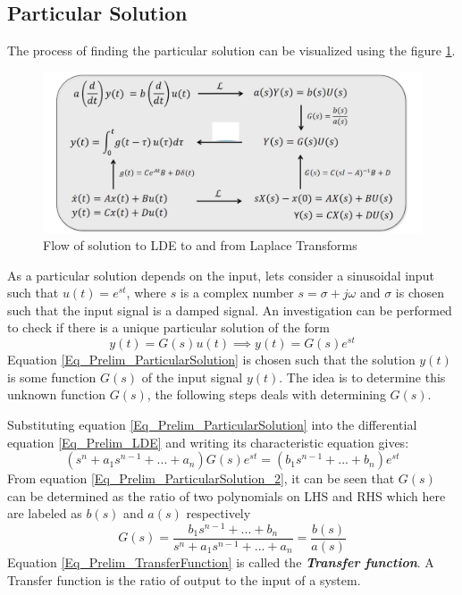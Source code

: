 \subsection{Particular Solution}
\newpage
The process of finding the particular solution can be visualized using the figure \ref{Fig_Pre_Flow_LDE_Sol_using_LT}.
\begin{figure}[h!]
	\centering
	\includegraphics[width=\linewidth]{Bilder/Solutiion_of_LDE_4m_LT}
	\caption{Flow of solution to LDE to and from Laplace Transforms}
	\label{Fig_Pre_Flow_LDE_Sol_using_LT}
\end{figure}

As a particular solution depends on the input, lets consider a sinusoidal input such that $ u(t) = e^{st}$, where $s$ is a complex number $s = \sigma + j \omega$ and $\sigma$ is chosen such that the input signal is a damped signal. An investigation can be performed to check if there is a unique particular solution of the form
\begin{equation} \label{Eq_Prelim_ParticularSolution}
	y(t) = G(s)u(t) \implies y(t) = G(s)e^{st}
\end{equation}
Equation \eqref{Eq_Prelim_ParticularSolution} is chosen such that the solution $y(t)$ is some function $G(s)$ of the input signal $y(t)$. The idea is to determine this unknown function $G(s)$, the following steps deals with determining $G(s)$. 

Substituting equation \eqref{Eq_Prelim_ParticularSolution} into the differential equation \eqref{Eq_Prelim_LDE} and writing its characteristic equation gives:
\begin{equation}\label{Eq_Prelim_ParticularSolution_2}
	(s^{n} + a_1 s^{n-1} + ... + a_n)G(s)e^{st} = (b_{1}s^{n-1} + ... + b_n)e^{st}
\end{equation}
From equation \eqref{Eq_Prelim_ParticularSolution_2}, it can be seen that $G(s)$ can be determined as the ratio of two polynomials on LHS and RHS which here are labeled as $b(s)$ and $a(s)$ respectively
\begin{equation}\label{Eq_Prelim_TransferFunction}
	G(s) = \frac{b_{1}s^{n-1} + ... + b_n}{s^{n} + a_1 s^{n-1} + ... + a_n} = \frac{b(s)}{a(s)}
\end{equation}
Equation \eqref{Eq_Prelim_TransferFunction} is called the \textbf{\textit{Transfer function}}. A Transfer function is the ratio of output to the input of a system.

